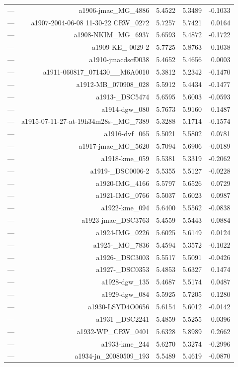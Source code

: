 \begin{table}[htbp]
\begin{tabular}{lrrrr}
— & a1906-jmac_MG_4886 & 5.4522 & 5.3489 & -0.1033 \\
— & a1907-2004-06-08 11-30-22 CRW_0272 & 5.7257 & 5.7421 & 0.0164 \\
— & a1908-NKIM_MG_6937 & 5.6593 & 5.4872 & -0.1722 \\
— & a1909-KE_-0029-2 & 5.7725 & 5.8763 & 0.1038 \\
— & a1910-jmacdscf0038 & 5.4652 & 5.4656 & 0.0003 \\
— & a1911-060817_071430__M6A0010 & 5.3812 & 5.2342 & -0.1470 \\
— & a1912-MB_070908_028 & 5.5912 & 5.4434 & -0.1477 \\
— & a1913-_DSC5474 & 5.6595 & 5.6003 & -0.0593 \\
— & a1914-dgw_080 & 5.7673 & 5.9160 & 0.1487 \\
— & a1915-07-11-27-at-19h34m28s-_MG_7389 & 5.3288 & 5.1714 & -0.1574 \\
— & a1916-dvf_065 & 5.5021 & 5.5802 & 0.0781 \\
— & a1917-jmac_MG_5620 & 5.7094 & 5.6906 & -0.0189 \\
— & a1918-kme_059 & 5.5381 & 5.3319 & -0.2062 \\
— & a1919-_DSC0006-2 & 5.5355 & 5.5127 & -0.0228 \\
— & a1920-IMG_4166 & 5.5797 & 5.6526 & 0.0729 \\
— & a1921-IMG_0766 & 5.5037 & 5.6023 & 0.0987 \\
— & a1922-kme_094 & 5.6400 & 5.5562 & -0.0838 \\
— & a1923-jmac_DSC3763 & 5.4559 & 5.5443 & 0.0884 \\
— & a1924-IMG_0226 & 5.6025 & 5.6149 & 0.0124 \\
— & a1925-_MG_7836 & 5.4594 & 5.3572 & -0.1022 \\
— & a1926-_DSC3003 & 5.5517 & 5.5091 & -0.0426 \\
— & a1927-_DSC0353 & 5.4853 & 5.6327 & 0.1474 \\
— & a1928-dgw_135 & 5.4687 & 5.5174 & 0.0487 \\
— & a1929-dgw_084 & 5.5925 & 5.7205 & 0.1280 \\
— & a1930-LSYD4O0656 & 5.6154 & 5.6012 & -0.0142 \\
— & a1931-_DSC2241 & 5.4859 & 5.5255 & 0.0396 \\
— & a1932-WP_CRW_0401 & 5.6328 & 5.8989 & 0.2662 \\
— & a1933-kme_244 & 5.6270 & 5.3274 & -0.2996 \\
— & a1934-jn_20080509_193 & 5.5489 & 5.4619 & -0.0870 \\

\end{tabular}
\end{table}
